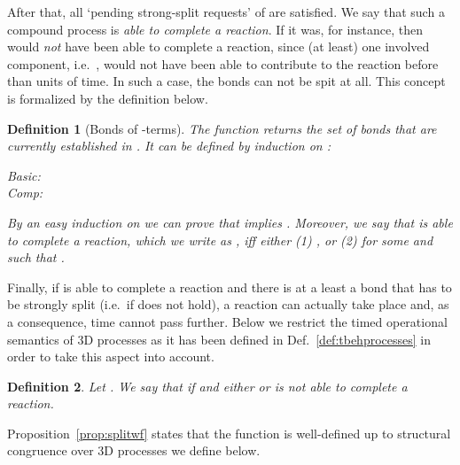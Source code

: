 \documentclass[11pt]{article}
\newtheorem{definition}{Definition}
\begin{document}
After that, all `pending strong-split requests' of  are
satisfied. We say that such a compound process is {\em able to complete a reaction}. If it was, for instance,  then  would {\em not} have been able to complete a reaction, since (at least) one involved component, i.e.\ , would not have been able to contribute to the reaction before than  units of time. In such a case, the bonds can not be spit at all. This concept is formalized by the definition below.

\begin{definition}[Bonds of -terms]\label{def:bonds}
The function  returns the set of bonds that are currently
established in . It can be defined by induction on :
\begin{tabbing}
Basic: \quad \= \\
Comp: \> 
\end{tabbing}

By an easy induction on  we can prove that  implies . Moreover, we say that  is {\em able to complete a reaction}, which we
write as , iff either (1) , or (2)  for some
 and  such that .
\end{definition}

Finally, if  is able to complete a reaction and there is at a least a bond that has to be
strongly split (i.e.\ if  does not hold), a reaction can actually take place
and, as a consequence, time cannot pass further. Below we restrict the timed operational
semantics of 3D processes as it has been defined in Def.~\ref{def:tbehprocesses} in order to take
this aspect into account.

\begin{definition}\label{def:strong-timed-behaviour}
Let . We say that  if  and either  or 
is {\em not} able to complete a reaction.
\end{definition}

\noindent Proposition~\ref{prop:splitwf} states that the function  is well-defined up to
structural congruence over 3D processes we define below.
\end{document}
